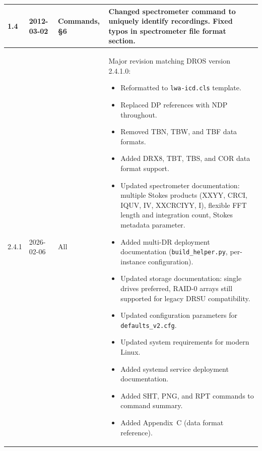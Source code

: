 \begin{longtable}{|p{1.2cm}|p{2.5cm}|p{2.5cm}|p{8cm}|}
1.4 & 2012-03-02 & Commands, \S6 &
    Changed spectrometer command to uniquely identify recordings.  Fixed typos in
    spectrometer file format section. \\
\hline

2.4.1 & 2026-02-06 & All &
    Major revision matching DROS version 2.4.1.0:
    \begin{itemize}[nosep,leftmargin=*]
        \item Reformatted to \texttt{lwa-icd.cls} template.
        \item Replaced DP references with NDP throughout.
        \item Removed TBN, TBW, and TBF data formats.
        \item Added DRX8, TBT, TBS, and COR data format support.
        \item Updated spectrometer documentation: multiple Stokes products
              (XXYY, CRCI, IQUV, IV, XXCRCIYY, I), flexible FFT length and
              integration count, Stokes metadata parameter.
        \item Added multi-DR deployment documentation
              (\texttt{build\_helper.py}, per-instance configuration).
        \item Updated storage documentation: single drives preferred,
              RAID-0 arrays still supported for legacy DRSU compatibility.
        \item Updated configuration parameters for \texttt{defaults\_v2.cfg}.
        \item Updated system requirements for modern Linux.
        \item Added systemd service deployment documentation.
        \item Added SHT, PNG, and RPT commands to command summary.
        \item Added Appendix~C (data format reference).
    \end{itemize} \\
\hline

\end{longtable}
